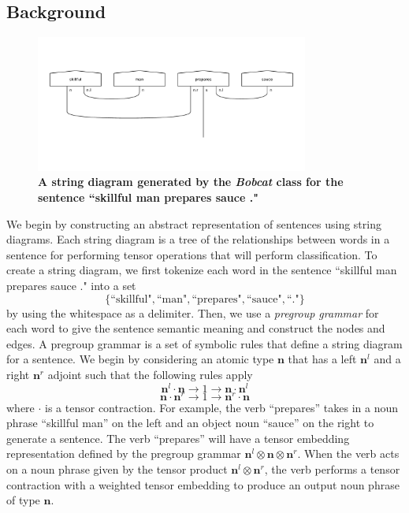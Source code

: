 \documentclass[12pt ]{article}
\def\n{\mathbf{n}}
\begin{document}
\subsection{Background}
\begin{figure}[t!]
  \centering
\includegraphics[width=0.8\textwidth]{../test/output/bobcat.pdf}
  \caption{ {\bf A string diagram generated by the {\it Bobcat} class for the sentence ``skillful man prepares sauce ."}}
  \label{fig:bobcat}
\end{figure}
We begin by constructing an abstract representation of sentences using string diagrams. Each string diagram is a tree of the relationships between words in a sentence for performing tensor operations that will perform classification. To create a string diagram, we first tokenize each word in the sentence ``skillful man prepares sauce ." into a set $$\{\text{``skillful"},\text{``man"},\text{``prepares"},\text{``sauce"}, \text{``."}\}$$ by using the whitespace as a delimiter. Then, we use a {\it pregroup grammar} for each word to give the sentence semantic meaning and construct the nodes and edges.
A pregroup grammar is a set of symbolic rules that define a string diagram for a sentence. We begin by considering an atomic type $\n$ that has a left $\n^l$ and a right $\n^r$ adjoint such that the following rules apply
$$ \n^l \cdot \n \rightarrow 1 \rightarrow \n \cdot \n^l$$
$$ \n \cdot \n^r \rightarrow 1 \rightarrow \n^r \cdot \n$$
where $\cdot$ is a tensor contraction. 
For example, the verb ``prepares'' takes in a noun phrase ``skillful man'' on the left and an object noun ``sauce'' on the right to generate a sentence. The verb ``prepares'' will have a tensor embedding representation defined by the pregroup grammar $\n^l \otimes \n \otimes \n^r $. When the verb acts on a noun phrase given by the tensor product $\n^l \otimes \n^r$, the verb performs a tensor contraction with a weighted tensor embedding to produce an output noun phrase of type $\n$.
\end{document}
